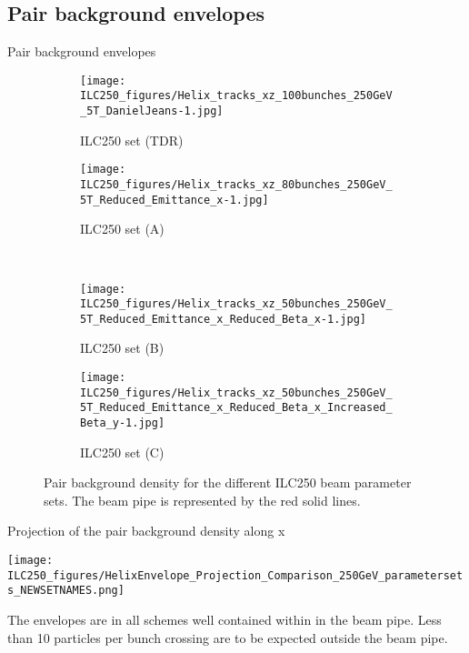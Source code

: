 \documentclass[xcolor={dvipsnames}]{beamer}
\begin{document}
\subsection{Pair background envelopes}
\begin{frame}{Pair background envelopes}
 \begin{figure}
\centering
\begin{subfigure}[t]{0.35\textwidth}
\centering
\texttt{[image: ILC250\_figures/Helix\_tracks\_xz\_100bunches\_250GeV\_5T\_DanielJeans-1.jpg]}
\caption{ILC250 set (TDR)}
\end{subfigure}
\hspace*{0.1cm}
\begin{subfigure}[t]{0.35\textwidth}
\centering
\texttt{[image: ILC250\_figures/Helix\_tracks\_xz\_80bunches\_250GeV\_5T\_Reduced\_Emittance\_x-1.jpg]}
\caption{ILC250 set (A)}
\end{subfigure}
\\
\begin{subfigure}[t]{0.35\textwidth}
\centering
\texttt{[image: ILC250\_figures/Helix\_tracks\_xz\_50bunches\_250GeV\_5T\_Reduced\_Emittance\_x\_Reduced\_Beta\_x-1.jpg]}
\caption{ILC250 set (B)}
\end{subfigure}
\hspace*{0.1cm}
\begin{subfigure}[t]{0.35\textwidth}
\centering
\texttt{[image: ILC250\_figures/Helix\_tracks\_xz\_50bunches\_250GeV\_5T\_Reduced\_Emittance\_x\_Reduced\_Beta\_x\_Increased\_Beta\_y-1.jpg]}
\caption{ILC250 set (C)}
\end{subfigure}
\caption{Pair background density for the different ILC250 beam parameter sets.
The beam pipe is represented by the red solid lines.}
\label{fig:Envelopes}
\end{figure}

\end{frame}

\begin{frame}{Projection of the pair background density along x}
\begin{center}
 \texttt{[image: ILC250\_figures/HelixEnvelope\_Projection\_Comparison\_250GeV\_parametersets\_NEWSETNAMES.png]}
\end{center}
The envelopes are in all schemes well contained within in the beam pipe. Less than 10 particles per bunch crossing are to be expected outside the beam pipe.
\end{frame}
\end{document}
